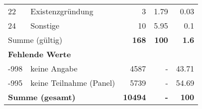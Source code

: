\begin{longtable}{lXrrr}
     22 &
     \multicolumn{1}{X}{ Existenzgründung   } &


       \num{3} &
       \num[round-mode=places,round-precision=2]{1.79} &
         \num[round-mode=places,round-precision=2]{0.03} \\

     24 &
     \multicolumn{1}{X}{ Sonstige   } &


       \num{10} &
       \num[round-mode=places,round-precision=2]{5.95} &
         \num[round-mode=places,round-precision=2]{0.1} \\
     \midrule
     \multicolumn{2}{l}{Summe (gültig)} &
       \textbf{\num{168}} &
     \textbf{\num{100}} &
       \textbf{\num[round-mode=places,round-precision=2]{1.6}} \\
     \multicolumn{5}{l}{\textbf{Fehlende Werte}}\\
       -998 &
       keine Angabe &
         \num{4587} &
        - &
         \num[round-mode=places,round-precision=2]{43.71} \\
       -995 &
       keine Teilnahme (Panel) &
         \num{5739} &
        - &
         \num[round-mode=places,round-precision=2]{54.69} \\
     \midrule
     \multicolumn{2}{l}{\textbf{Summe (gesamt)}} &
          \textbf{\num{10494}} &
        \textbf{-} &
        \textbf{\num{100}} \\
     \bottomrule
     \end{longtable}
     
